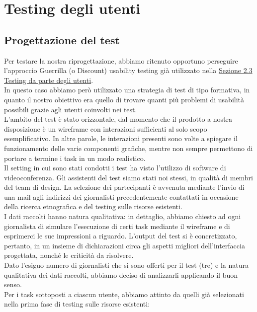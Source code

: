 \section{Testing degli utenti}
\label{s:testing-utenti}

\subsection{Progettazione del test}
\label{ss:vd-progettazione-test}
Per testare la nostra riprogettazione, abbiamo ritenuto opportuno perseguire l'approccio Guerrilla (o Discount) usability testing già utilizzato nella \hyperref[s:verifica-risorse-esistenti-testing-utenti]{Sezione 2.3 Testing da parte degli utenti}.\\
In questo caso abbiamo però utilizzato una strategia di test di tipo formativa, in quanto il nostro obiettivo era quello di trovare quanti più problemi di usabilità possibili grazie agli utenti coinvolti nei test.\\
L'ambito del test è stato orizzontale, dal momento che il prodotto a nostra disposizione è un wireframe con interazioni sufficienti al solo scopo esemplificativo. In altre parole, le interazioni presenti sono volte a spiegare il funzionamento delle varie componenti grafiche, mentre non sempre permettono di portare a termine i task in un modo realistico.\\
Il setting in cui sono stati condotti i test ha visto l'utilizzo di software di videoconferenza. Gli assistenti del test siamo stati noi stessi, in qualità di membri del team di design. La selezione dei partecipanti è avvenuta mediante l'invio di una mail agli indirizzi dei giornalisti precedentemente contattati in occasione della ricerca etnografica e del testing sulle risorse esistenti.\\
I dati raccolti hanno natura qualitativa: in dettaglio, abbiamo chiesto ad ogni giornalista di simulare l'esecuzione di certi task mediante il wireframe e di esprimerci le sue impressioni a riguardo. L'output del test si è concretizzato, pertanto, in un insieme di dichiarazioni circa gli aspetti migliori dell'interfaccia progettata, nonché le criticità da risolvere.\\
Dato l'esiguo numero di giornalisti che si sono offerti per il test (tre) e la natura qualitativa dei dati raccolti, abbiamo deciso di analizzarli applicando il buon senso.\\
Per i task sottoposti a ciascun utente, abbiamo attinto da quelli già selezionati nella prima fase di testing sulle risorse esistenti:
